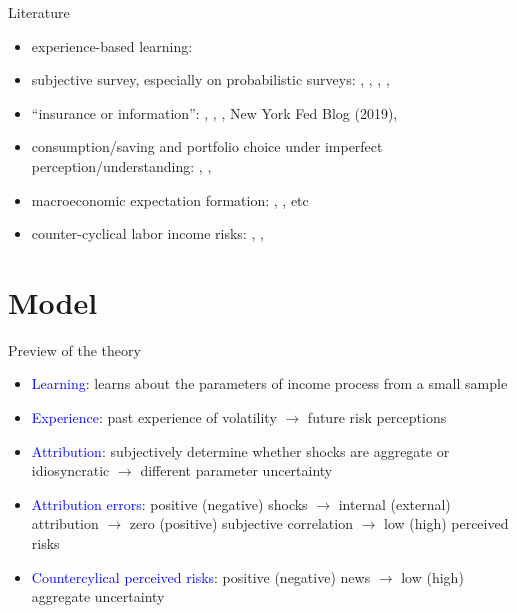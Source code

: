 \documentclass{beamer}
\begin{document}
\begin{frame}{Literature}
\begin{itemize}
	 \item experience-based learning: \cite{malmendier2015learning} 
	 \item subjective survey, especially on probabilistic surveys: \cite{manski_measuring_2004}, \cite{delavande2011measuring}, \cite{manski_survey_2018},  \cite{bertrand_people_2001}, \cite{armantier_overview_2017}
	\item ``insurance or information'':  \cite{kaufmann_disentangling_2009},  \cite{meghir2011earnings}, \cite{pistaferri_superior_2001}, New York Fed Blog (2019),  \cite{flavin_excess_1988}
   \item consumption/saving and portfolio choice under imperfect perception/understanding:  \cite{rozsypal_overpersistence_2017}, \cite{carroll_sticky_2018}, \cite{lian2019imperfect}
   \item macroeconomic expectation formation: \cite{coibion2012can}, \cite{fuhrer2018intrinsic}, etc
   \item counter-cyclical labor income risks: \cite{storesletten2004cyclical}, \cite{guvenen2014nature}, \cite{catherine_countercyclical_2019}
  \end{itemize}
\end{frame}


\section{Model}


\begin{frame}{Preview of the theory}
	\begin{itemize}
		\item \textcolor{blue}{Learning}: learns about the parameters of income process from a small sample 
		\item \textcolor{blue}{Experience}: past experience of volatility $\rightarrow$  future risk perceptions 
		\item \textcolor{blue}{Attribution}: subjectively determine whether shocks are aggregate or idiosyncratic $\rightarrow$ different parameter uncertainty
		\item \textcolor{blue}{Attribution errors}: positive (negative) shocks $\rightarrow$ internal (external) attribution $\rightarrow$  zero (positive) subjective correlation $\rightarrow$ low (high) perceived risks 
		\item \textcolor{blue}{Countercylical perceived risks}: positive (negative) news $\rightarrow$ low (high) aggregate uncertainty  
		\end{itemize}
\end{frame}
\end{document}
